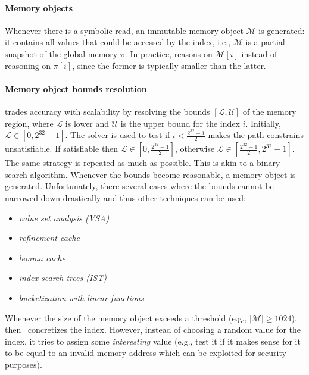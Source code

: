 \paragraph{Memory objects} Whenever there is a symbolic read, an immutable memory object $\mathcal{M}$ is generated:  it contains all values that could be accessed by the index, i.e., $\mathcal{M}$ is a partial snapshot of the global memory $\pi$. In practice, \cite{MAYHEM-SP12} reasons on $\mathcal{M}[i]$ instead of reasoning on $\pi[i]$, since the former is typically smaller than the latter.

\paragraph{Memory object bounds resolution} \cite{MAYHEM-SP12} trades accuracy with scalability by resolving the bounds $[\mathcal{L}, \mathcal{U}]$ of the memory region, where $\mathcal{L}$ is lower and $\mathcal{U}$ is the upper bound for the index $i$. Initially, $\mathcal{L} \in [0, 2^{32}-1]$. The solver is used to test if $i < \frac{2^{32}-1}{2}$ makes the path constrains unsatisfiable. If satisfiable then $\mathcal{L} \in [0, \frac{2^{32}-1}{2}]$, otherwise $\mathcal{L} \in [\frac{2^{32}-1}{2}, 2^{32}-1]$. The same strategy is repeated as much as possible. This is akin to a binary search algorithm. Whenever the bounds become reasonable, a memory object is generated. Unfortunately, there several cases where the bounds cannot be narrowed down drastically and thus other techniques can be used:
\begin{itemize}
  \item {\em value set analysis (VSA)}
  \item {\em refinement cache}
  \item {\em lemma cache}
  \item {\em index search trees (IST)}
  \item {\em bucketization with linear functions}
\end{itemize}
Whenever the size of the memory object exceeds a threshold (e.g., $|\mathcal{M}| \geq 1024$), then~\cite{MAYHEM-SP12} concretizes the index. However, instead of choosing a random value for the index, it tries to assign some {\em interesting} value (e.g., test it if it makes sense for it to be equal to an invalid memory address which can be exploited for security purposes).

